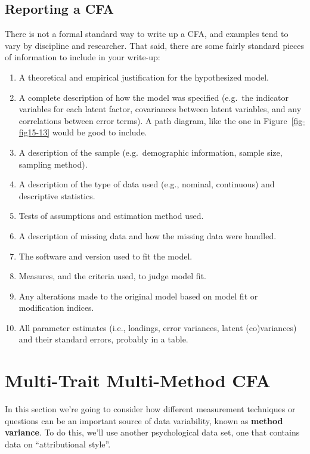 \documentclass[
  a4paper,
]{book}
\begin{document}
\hypertarget{reporting-a-cfa}{%
\subsection{Reporting a CFA}\label{reporting-a-cfa}}

There is not a formal standard way to write up a CFA, and examples tend
to vary by discipline and researcher. That said, there are some fairly
standard pieces of information to include in your write-up:

\begin{enumerate}
\def\labelenumi{\arabic{enumi}.}
\item
  A theoretical and empirical justification for the hypothesized model.
\item
  A complete description of how the model was specified (e.g.~the
  indicator variables for each latent factor, covariances between latent
  variables, and any correlations between error terms). A path diagram,
  like the one in Figure~\ref{fig-fig15-13} would be good to include.
\item
  A description of the sample (e.g.~demographic information, sample
  size, sampling method).
\item
  A description of the type of data used (e.g., nominal, continuous) and
  descriptive statistics.
\item
  Tests of assumptions and estimation method used.
\item
  A description of missing data and how the missing data were handled.
\item
  The software and version used to fit the model.
\item
  Measures, and the criteria used, to judge model fit.
\item
  Any alterations made to the original model based on model fit or
  modification indices.
\item
  All parameter estimates (i.e., loadings, error variances, latent
  (co)variances) and their standard errors, probably in a table.
\end{enumerate}

\hypertarget{multi-trait-multi-method-cfa}{%
\section{Multi-Trait Multi-Method
CFA}\label{multi-trait-multi-method-cfa}}

In this section we're going to consider how different measurement
techniques or questions can be an important source of data variability,
known as \textbf{method variance}. To do this, we'll use another
psychological data set, one that contains data on ``attributional
style''.
\end{document}
